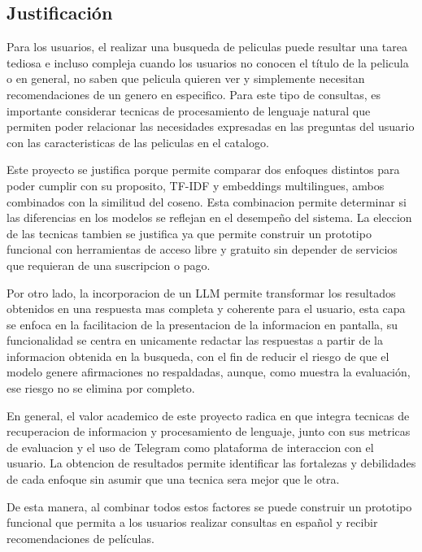 ﻿\subsection{Justificación}

Para los usuarios, el realizar una busqueda de peliculas puede resultar una tarea tediosa e incluso compleja cuando los usuarios no conocen el título de la pelicula \cite{arguello2021tot} o en general, no saben que pelicula quieren ver y simplemente necesitan recomendaciones de un genero en especifico. Para este tipo de consultas, es importante considerar tecnicas de procesamiento de lenguaje natural que permiten poder relacionar las necesidades expresadas en las preguntas del usuario con las caracteristicas de las peliculas en el catalogo.

Este proyecto se justifica porque permite comparar dos enfoques distintos para poder cumplir con su proposito, TF-IDF y embeddings multilingues, ambos combinados con la similitud del coseno. Esta combinacion permite determinar si las diferencias en los modelos se reflejan en el desempeño del sistema. La eleccion de las tecnicas tambien se justifica ya que permite construir un prototipo funcional con herramientas de acceso libre y gratuito sin depender de servicios que requieran de una suscripcion o pago. 

Por otro lado, la incorporacion de un LLM permite transformar los resultados obtenidos en una respuesta mas completa y coherente para el usuario, esta capa se enfoca en la facilitacion de la presentacion de la informacion en pantalla, su funcionalidad se centra en unicamente redactar las respuestas a partir de la informacion obtenida en la busqueda, con el fin de reducir el riesgo de que el modelo genere afirmaciones no respaldadas, aunque, como muestra la evaluación, ese riesgo no se elimina por completo.

En general, el valor academico de este proyecto radica en que integra tecnicas de recuperacion de informacion y procesamiento de lenguaje, junto con sus metricas de evaluacion y el uso de Telegram como plataforma de interaccion con el usuario. La obtencion de resultados permite identificar las fortalezas y debilidades de cada enfoque sin asumir que una tecnica sera mejor que le otra.

De esta manera, al combinar todos estos factores se puede construir un prototipo funcional que permita a los usuarios realizar consultas en español y recibir recomendaciones de películas.  